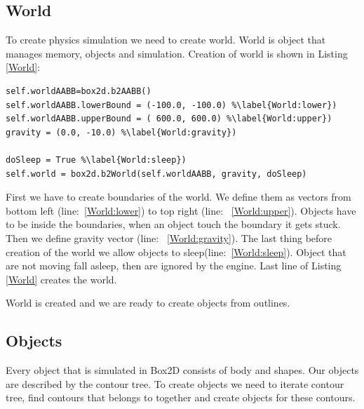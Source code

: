 \documentclass{ifacconf}
\begin{document}
\subsection{World}
To create physics simulation we need to create world. World is object that
manages memory, objects and simulation. Creation of world is shown in Listing
\ref{World}:
\begin{lstlisting}[caption=Creation of Box2D world,label=World]
self.worldAABB=box2d.b2AABB()
self.worldAABB.lowerBound = (-100.0, -100.0) %\label{World:lower})
self.worldAABB.upperBound = ( 600.0, 600.0)	%\label{World:upper})
gravity = (0.0, -10.0) %\label{World:gravity})

doSleep = True %\label{World:sleep})
self.world = box2d.b2World(self.worldAABB, gravity, doSleep)
\end{lstlisting}
First we have to create boundaries of the world. We define them as vectors from
bottom left (line:~\ref{World:lower}) to top right (line:~
\ref{World:upper}). Objects have to be inside the boundaries, when an object
touch the boundary it gets stuck. Then we define gravity vector (line:~
\ref{World:gravity}). The last thing before creation of the world we allow
objects to sleep(line:~\ref{World:sleep}). Object that are not moving fall
asleep, then are ignored by the engine. Last line of Listing \ref{World} creates
the world.

World is created and we are ready to create objects from outlines.
\subsection{Objects}
Every object that is simulated in Box2D consists of body and shapes. Our objects
are described by the contour tree. To create objects we need to iterate contour
tree, find contours that belongs to together and create objects for these
contours.
\end{document}
